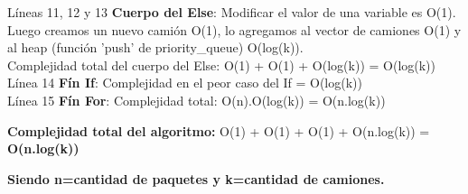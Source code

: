 Líneas 11, 12 y 13 \textbf{Cuerpo del Else}: Modificar el valor de una variable es O(1).\\
Luego creamos un nuevo camión O(1), lo agregamos al vector de camiones O(1) y al heap (función 'push' de priority\_queue) O(log(k)).\\
Complejidad total del cuerpo del Else: O(1) + O(1) + O(log(k)) = O(log(k))\\

Línea 14 \textbf{Fín If}: Complejidad en el peor caso del If = O(log(k))\\

Línea 15 \textbf{Fín For}: Complejidad total: O(n).O(log(k)) = O(n.log(k))\\

\begin{flushleft}
\textbf{Complejidad total del algoritmo:} O(1) + O(1) + O(1) + O(n.log(k)) = \textbf{O(n.log(k))}\\
\end{flushleft}
\textbf{Siendo n=cantidad de paquetes y k=cantidad de camiones.}\\






